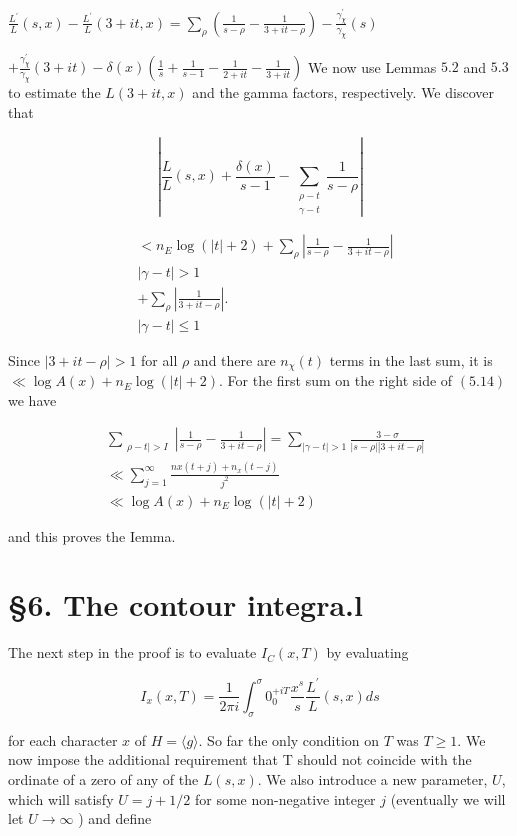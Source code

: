 $\frac{L^{\prime}}{L}(s, x)-\frac{L^{\prime}}{L}(3+i t, x)=\sum_{\rho}\left(\frac{1}{s-\rho}-\frac{1}{3+i t-\rho}\right)-\frac{\gamma_{\chi}^{\prime}}{\gamma_{\chi}}(s)$

$+\frac{\gamma_{\chi}^{\prime}}{\gamma_{\chi}}(3+i t)-\delta(x)\left(\frac{1}{s}+\frac{1}{s-1}-\frac{1}{2+i t}-\frac{1}{3+i t}\right)$ We now use Lemmas $5.2$ and $5.3$ to estimate the $L(3+i t, x)$ and the gamma factors, respectively. We discover that

$$
\left|\frac{L}{L}(s, x)+\frac{\delta(x)}{s-1}-\sum_{\substack{\rho-t \\ \gamma-t}} \frac{1}{s-\rho}\right|
$$

$$
\begin{aligned}
& <n_{E} \log (|t|+2)+\sum_{\rho}\left|\frac{1}{s-\rho}-\frac{1}{3+i t-\rho}\right| \\
& |\gamma-t|>1 \\
& +\sum_{\rho}\left|\frac{1}{3+i t-\rho}\right| \text {. } \\
& |\gamma-t| \leqslant 1
\end{aligned}
$$

Since $|3+i t-\rho|>1$ for all $\rho$ and there are $n{ }_{\chi}(t)$ terms in the last sum, it is $\ll \log A(x)+n_{E} \log (|t|+2)$. For the first sum on the right side of $(5.14)$ we have

$$
\begin{aligned}
& \sum_{\substack{\rho-t \mid>I}}\left|\frac{1}{s-\rho}-\frac{1}{3+i t-\rho}\right|=\sum_{|\gamma-t|>1} \frac{3-\sigma}{|s-\rho||3+i t-\rho|} \\
& \ll \sum_{j=1}^{\infty} \frac{n x(t+j)+n_{x}(t-j)}{j^{2}} \\
& \ll \log A(x)+n_{E} \log (|t|+2)
\end{aligned}
$$

and this proves the Iemma. 

\section{§6. The contour integra.l}

The next step in the proof is to evaluate $I_{C}(x, T)$ by evaluating

$$
I_{x}(x, T)=\frac{1}{2 \pi i} \int_{\sigma}^{\sigma} 0_{0}^{+i T} \frac{x^{s}}{s} \frac{L^{\prime}}{L}(s, x) d s
$$

for each character $x$ of $H=\langle g\rangle$. So far the only condition on $T$ was $T \geqslant 1$. We now impose the additional requirement that T should not coincide with the ordinate of a zero of any of the $L(s, x)$. We also introduce a new parameter, $U$, which will satisfy $U=j+1 / 2$ for some non-negative integer $j$ (eventually we will let $U \rightarrow \infty$ ) and define

